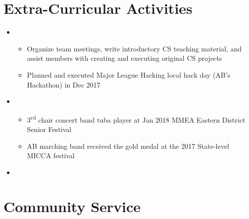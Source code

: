 \documentclass[11pt,a4paper,sans]{moderncv}        %
\begin{document}
\section{Extra-Curricular Activities}

\vspace{5pt}

\begin{itemize}

\item{
{\vspace{3pt} 
\begin{itemize}
\item Organize team meetings, write introductory CS teaching material, and assist members with creating and executing original CS projects
\item  Planned and executed Major League Hacking local hack day (AB's Hackathon) in Dec 2017
\end{itemize}
}}

\item{
{\vspace{3pt} 
\begin{itemize}
\item 3\textsuperscript{rd} chair concert band tuba player at Jan 2018 MMEA Eastern District Senior Festival
\item AB marching band received the gold medal at the 2017 State-level MICCA festival
\end{itemize}}}

\item{}
\end{itemize}

\section{Community Service}

\vspace{5pt}
\end{document}
